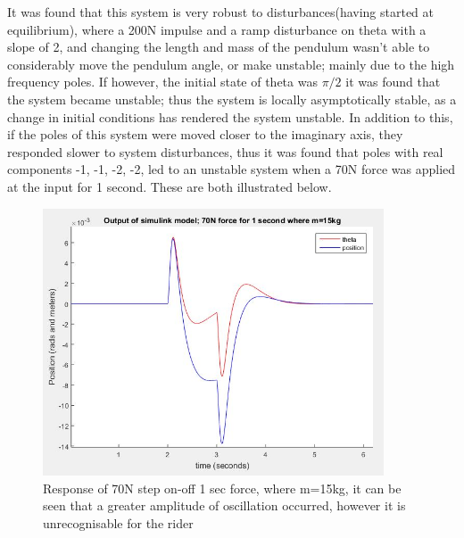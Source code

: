 \documentclass[12pt]{article}
\begin{document}
It was found that this system is very robust to disturbances(having started at equilibrium), where a 200N impulse and a ramp disturbance on theta with a slope of 2, and changing the length and mass of the pendulum wasn't able to considerably move the pendulum angle, or make unstable; mainly due to the high frequency poles. If however, the initial state of theta was $\pi /2$ it was found that the system became unstable; thus the system is locally asymptotically stable, as a change in initial conditions has rendered the system unstable. In addition to this, if the poles of this system were moved closer to the imaginary axis, they responded slower to system disturbances, thus it was found that poles with real components -1, -1, -2, -2, led to an unstable system when a 70N force was applied at the input for 1 second. These are both illustrated below.

\begin{center}
\begin{figure}[htb]
	\includegraphics[width=0.9\textwidth]{PBA3_5_m_15.jpg}
\caption{Response of 70N step on-off 1 sec force, where m=15kg, it can be seen that a greater amplitude of oscillation occurred, however it is unrecognisable for the rider}
\end{figure}
\end{center}
\end{document}
